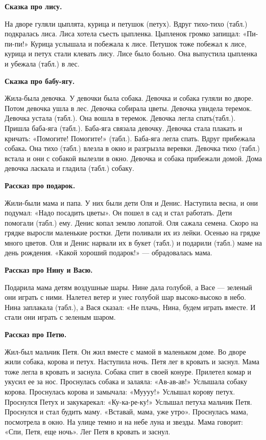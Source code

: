 \documentclass[a5paper]{book}
\begin{document}
\textbf{Сказка про лису.}

На дворе гуляли цыплята, курица и петушок (петух). Вдруг тихо-тихо
(табл.) подкралась лиса. Лиса хотела съесть цыпленка. Цыпленок громко
запищал: «Пи-пи-пи!» Курица услышала и побежала к лисе. Петушок тоже
побежал к лисе, курица и петух стали клевать лису. Лисе было больно. Она
выпустила цыпленка и убежала (табл.) в лес.

\textbf{Сказка про бабу-ягу.}

Жила-была девочка. У девочки была собака. Девочка и собака гуляли во
дворе. Потом девочка ушла в лес. Девочка собирала цветы. Девочка увидела
теремок. Девочка устала (табл.). Она вошла в теремок. Девочка легла
спать(табл.). Пришла баба-яга (табл.). Баба-яга связала девочку. Девочка
стала плакать и кричать: «Помогите! Помогите!» (табл.). Баба-яга легла
спать. Вдруг прибежала собака\textbf{.} Она тихо (табл.) влезла в окно и
разгрызла веревки. Девочка тихо (табл.) встала и они с собакой вылезли в
окно. Девочка и собака прибежали домой. Дома девочка ласкала и гладила
(табл.) собаку.

\textbf{Рассказ про подарок.}

Жили-были мама и папа. У них были дети Оля и Денис. Наступила весна, и
они подумал: «Надо посадить цветы». Он пошел в сад и стал работать. Дети
помогали (табл.) ему. Денис копал землю лопатой. Оля сажала семена.
Скоро на грядке выросли маленькие ростки. Дети поливали их из лейки.
Осенью на грядке много цветов. Оля и Денис нарвали их в букет (табл.) и
подарили (табл.) маме на день рождения. «Какой хороший подарок!» ---
обрадовалась мама.

\textbf{Рассказ про Нину и Васю.}

Подарила мама детям воздушные шары. Нине дала голубой, а Васе ---
зеленый они играть с ними. Налетел ветер и унес голубой шар
высоко-высоко в небо. Нина заплакала (табл.), а Вася сказал: «Не плачь,
Нина, будем играть вместе. И стали они играть с зеленым шаром.

\textbf{Рассказ про Петю.}

Жил-был мальчик Петя. Он жил вместе с мамой в маленьком доме. Во дворе
жили собака, корова и петух. Наступила ночь. Петя лег в кровать и
заснул. Мама тоже легла в кровать и заснула. Собака спит в своей конуре.
Прилетел комар и укусил ее за нос. Проснулась собака и залаяла:
«Ав-ав-ав!» Услышала собаку корова. Проснулась корова и замычала:
«Муууу!» Услышал корову петух. Проснулся Петух и закукарекал:
«Ку-ка-ре-ку!» Услышал петуха мальчик Петя. Проснулся и стал будить
маму. «Вставай, мама, уже утро». Проснулась мама, посмотрела в окно. На
улице темно и на небе луна и звезды. Мама говорит: «Спи, Петя, еще
ночь». Лег Петя в кровать и заснул.
\end{document}
